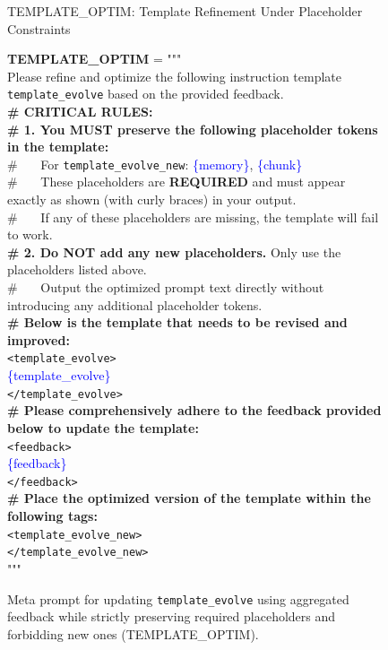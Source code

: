 

\begin{figure}[!ht] 
\begin{AIboxBlueFrame}{TEMPLATE\_OPTIM: Template Refinement Under Placeholder Constraints}
\vspace{1mm}
{\footnotesize
\setlength{\parindent}{0pt}
\setlength{\parskip}{2pt}

\textbf{TEMPLATE\_OPTIM} = """ \\
Please refine and optimize the following instruction template \texttt{template\_evolve} based on the provided feedback. \\

\textbf{\# CRITICAL RULES:} \\
\textbf{\# 1. You MUST preserve the following placeholder tokens in the template:} \\
\# \ \ \ For \texttt{template\_evolve\_new}: \textcolor{blue}{\{memory\}}, \textcolor{blue}{\{chunk\}} \\
\# \ \ \ These placeholders are \textbf{REQUIRED} and must appear exactly as shown (with curly braces) in your output. \\
\# \ \ \ If any of these placeholders are missing, the template will fail to work. \\
\textbf{\# 2. Do NOT add any new placeholders.} Only use the placeholders listed above. \\
\# \ \ \ Output the optimized prompt text directly without introducing any additional placeholder tokens. \\

\textbf{\# Below is the template that needs to be revised and improved:} \\

\texttt{<template\_evolve>} \\
\textcolor{blue}{\{template\_evolve\}} \\
\texttt{</template\_evolve>} \\

\textbf{\# Please comprehensively adhere to the feedback provided below to update the template:} \\

\texttt{<feedback>} \\
\textcolor{blue}{\{feedback\}} \\
\texttt{</feedback>} \\

\textbf{\# Place the optimized version of the template within the following tags:} \\

\texttt{<template\_evolve\_new>} \\
\texttt{</template\_evolve\_new>} \\
"""
}
\end{AIboxBlueFrame}
\vspace{-1em}
\caption{Meta prompt for updating \texttt{template\_evolve} using aggregated feedback while strictly preserving required placeholders and forbidding new ones (TEMPLATE\_OPTIM).}
\label{prompt:template_optim}
\end{figure}

